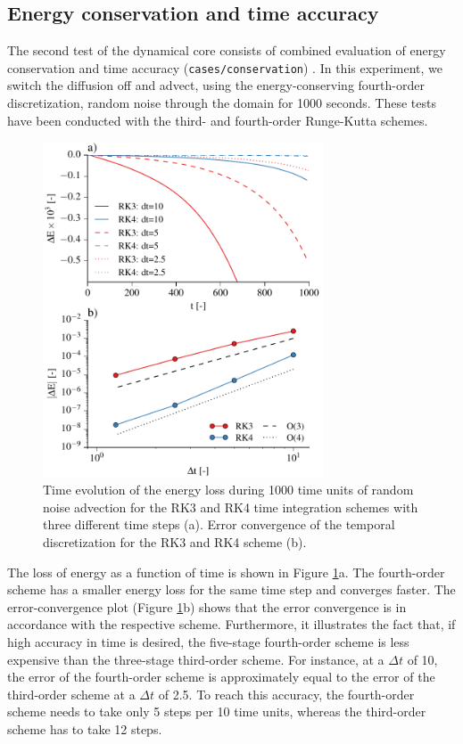 \documentclass[gmd]{copernicus}
\begin{document}
\subsection{Energy conservation and time accuracy} \label{sec:validationtime}
The second test of the dynamical core consists of combined evaluation of energy conservation and time accuracy (\texttt{cases/conservation}) . In this experiment, we switch the diffusion off and advect, using the energy-conserving fourth-order discretization, random noise through the domain for 1000 seconds. These tests have been conducted with the third- and fourth-order Runge-Kutta schemes.
\begin{figure}[t]
\vspace*{2mm}
\begin{center}
\includegraphics[width=8.3cm]{figs/timeconvergence.pdf}
\end{center}
\caption{Time evolution of the energy loss during 1000 time units of random noise advection for the RK3 and RK4 time integration schemes with three different time steps (a). Error convergence of the temporal discretization for the RK3 and RK4 scheme (b).}\label{fig:timeconvergence}
\end{figure}

The loss of energy as a function of time is shown in Figure \ref{fig:timeconvergence}a. The fourth-order scheme has a smaller energy loss for the same time step and converges faster. The error-convergence plot (Figure \ref{fig:timeconvergence}b) shows that the error convergence is in accordance with the respective scheme. Furthermore, it illustrates the fact that, if high accuracy in time is desired, the five-stage fourth-order scheme is less expensive than the three-stage third-order scheme. For instance, at a $\Delta t$ of 10, the  error of the fourth-order scheme is approximately equal to the error of the third-order scheme at a $\Delta t$ of 2.5. To reach this accuracy, the fourth-order scheme needs to take only 5 steps per 10 time units, whereas the third-order scheme has to take 12 steps.
\end{document}
